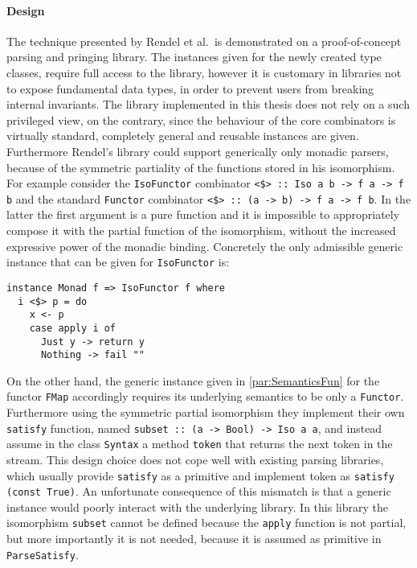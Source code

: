 \documentclass[../Thesis.tex]{subfiles}
\begin{document}
\paragraph{Design}
The technique presented by Rendel et al.\ is demonstrated 
on a proof-of-concept parsing and pringing library.
The instances given for the newly created type classes,
require full access to the library, however
it is customary in libraries not to expose fundamental data types, 
in order to prevent users from breaking internal invariants.
The library implemented in this thesis
does not rely on a such privileged view, on the contrary, 
since the behaviour of the core combinators is virtually
standard, completely general and reusable instances are given.
Furthermore Rendel's library could support generically only
monadic parsers, because of the symmetric partiality of
the functions stored in his isomorphism.
For example consider the \texttt{IsoFunctor} combinator
\texttt{<\$> :: Iso a b -> f a -> f b} and the standard
\texttt{Functor} combinator \texttt{<\$> :: (a -> b) -> f a -> f b}.
In the latter the first argument is a pure function and it is impossible
to appropriately compose it with the partial function of
the isomorphism, without the increased
expressive power of the monadic binding.
Concretely the only admissible generic instance that can be 
given for \texttt{IsoFunctor} is:
\begin{verbatim}
instance Monad f => IsoFunctor f where 
  i <$> p = do
    x <- p
    case apply i of
      Just y -> return y
      Nothing -> fail ""
\end{verbatim} 
On the other hand, the generic instance given in \ref{par:SemanticsFun} for
the functor \texttt{FMap} accordingly requires its underlying semantics to be
only a \texttt{Functor}.
Furthermore using the symmetric partial isomorphism they implement their 
own \texttt{satisfy} function, named \texttt{subset :: (a -> Bool) -> Iso a a},
and instead assume in the class \texttt{Syntax} a method
\texttt{token} that returns the next token in the stream.
This design choice does not cope well with existing parsing libraries,
which usually provide \texttt{satisfy} as a primitive and implement
token as \texttt{satisfy (const True)}. An unfortunate consequence 
of this mismatch is that a generic instance would poorly interact with
the underlying library.
In this library the isomorphism \texttt{subset} cannot be defined because
the \texttt{apply} function is not partial, but more importantly it
is not needed, because it is assumed as primitive in \texttt{ParseSatisfy}.
\end{document}
